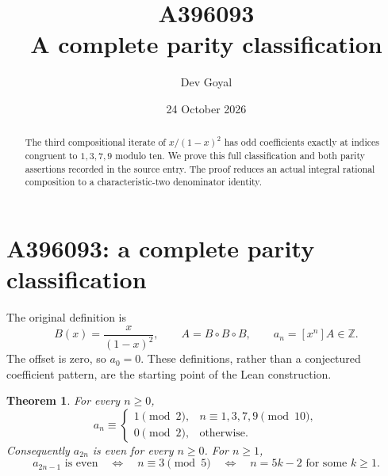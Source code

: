 \documentclass[11pt,a4paper]{article}
\title{A396093\\[3pt]A complete parity classification}
\author{Dev Goyal}
\date{24 October 2026}
\newtheorem{theorem}{Theorem}[section]
\theoremstyle{remark}
\newcommand{\Z}{\mathbb Z}
\begin{document}
\maketitle
\begin{center}
\end{center}
\begin{abstract}
The third compositional iterate of $x/(1-x)^2$ has odd coefficients exactly at indices congruent to $1,3,7,9$ modulo ten. We prove this full classification and both parity assertions recorded in the source entry. The proof reduces an actual integral rational composition to a characteristic-two denominator identity.
\end{abstract}
\section{A396093: a complete parity classification}

The original definition is
\[
B(x)=\frac{x}{(1-x)^2},\qquad A=B\circ B\circ B,
\qquad a_n=[x^n]A\in\Z.
\]
The offset is zero, so $a_0=0$. These definitions, rather than a conjectured
coefficient pattern, are the starting point of the Lean construction.

\begin{theorem}\label{thm:parity}
For every $n\ge0$,
\[
a_n\equiv
\begin{cases}
1\pmod2,&n\equiv1,3,7,9\pmod{10},\\
0\pmod2,&\text{otherwise}.
\end{cases}
\]
Consequently $a_{2n}$ is even for every $n\ge0$. For $n\ge1$,
\[
a_{2n-1}\text{ is even}
\quad\Longleftrightarrow\quad n\equiv3\pmod5
\quad\Longleftrightarrow\quad n=5k-2\text{ for some }k\ge1.
\]
\end{theorem}
\end{document}
